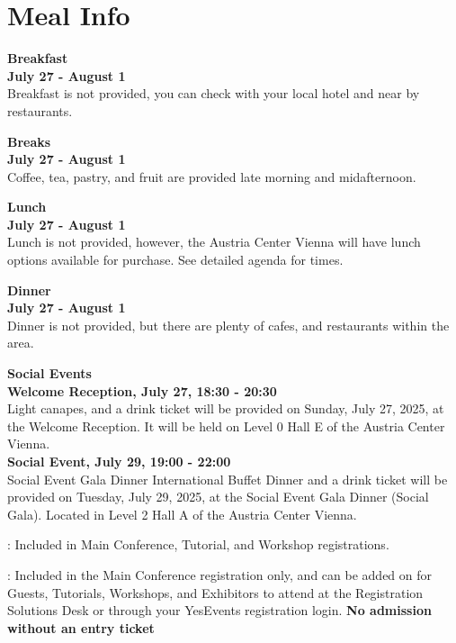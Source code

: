 \chapter{Meal Info}
\vspace*{0.2cm}

\textbf{Breakfast}\\

\textbf{July 27 - August 1}\\
Breakfast is not provided, you can check with your local hotel and near by restaurants.

\textbf{Breaks \ast}\\

\textbf{July 27 - August 1}\\
Coffee, tea, pastry, and fruit are provided late morning and midafternoon.

\textbf{Lunch}\\

\textbf{July 27 - August 1}\\
Lunch is not provided, however, the Austria Center Vienna will have lunch options available for purchase. See detailed agenda for times. 

\textbf{Dinner}\\

\textbf{July 27 - August 1}\\
Dinner is  not provided, but there are plenty of cafes, and restaurants within the area.

\textbf{Social Events \ast\ast} \\
\textbf{Welcome Reception, July 27, 18:30 - 20:30}\\
Light canapes, and a drink ticket will be provided on Sunday, July 27, 2025, at the Welcome Reception. It will be held on Level 0 Hall E of the Austria Center Vienna.\\

\textbf{Social Event, July 29, 19:00 - 22:00}\\
Social Event Gala Dinner International Buffet Dinner and a drink ticket will be provided on Tuesday, July 29, 2025, at the Social Event Gala Dinner (Social Gala). Located in Level 2 Hall A of the Austria Center Vienna.\\

\vspace{4em}

\ast: Included in Main Conference, Tutorial, and Workshop registrations.

\ast\ast: Included in the Main Conference registration only, and can be added on for Guests, Tutorials, Workshops, and Exhibitors to attend at the Registration Solutions Desk or through your YesEvents registration login. \textbf{No admission without an entry ticket}
